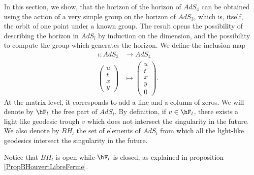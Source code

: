 In this section, we show, that the horizon of the horizon of $AdS_4$ can be obtained using the action of a very simple group on the horizon of $AdS_3$, which is, itself, the orbit of one point under a known group. The result opens the possibility of describing the horizon in $AdS_l$ by induction on the dimension, and the possibility to compute the group which generates the horizon.  We define the inclusion map 
\begin{equation}
	\begin{aligned}
		\iota\colon AdS_3&\to AdS_4 \\
		\begin{pmatrix}
			u	\\ 
			t	\\ 
			x	\\ 
			y	
		\end{pmatrix}&\mapsto \begin{pmatrix}
			u	\\ 
			t	\\ 
			x	\\ 
			y	\\ 
			0	
		\end{pmatrix}.
	\end{aligned}
\end{equation}
At the matrix level, it corresponds to add a line and a column of zeros. We will denote by $\hF_l$ the free part of $AdS_l$. By definition, if $v\in\hF_l$, there exists a light like geodesic trough $v$ which does not intersect the singularity in the future. We also denote by $BH_l$ the set of elements of $AdS_l$ from which all the light-like geodesics intersect the singularity in the future.

Notice that $BH_l$ is open while $\hF_l$ is closed, as explained in proposition \ref{PropBHouvertLibreFerme}.

